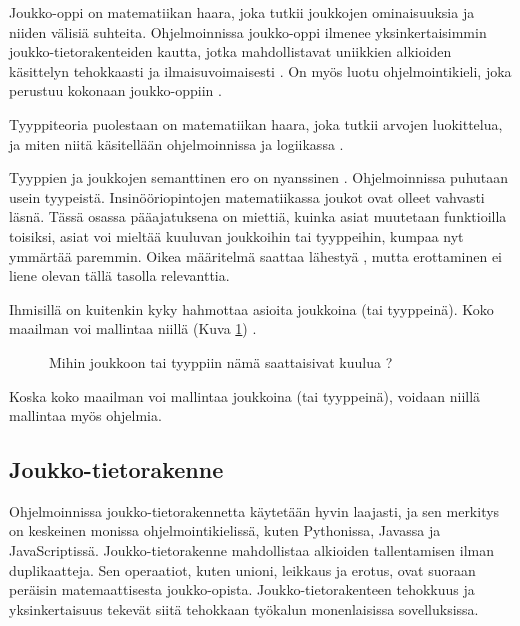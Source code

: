 Joukko-oppi on matematiikan haara, joka tutkii joukkojen ominaisuuksia ja niiden välisiä suhteita. Ohjelmoinnissa joukko-oppi ilmenee yksinkertaisimmin joukko-tietorakenteiden kautta, jotka mahdollistavat uniikkien alkioiden käsittelyn tehokkaasti ja ilmaisuvoimaisesti \cite{mdn_set,mdn_set_methods}. On myös luotu ohjelmointikieli, joka perustuu kokonaan joukko-oppiin \cite{SETL_SET_LANGUAGE}.

Tyyppiteoria puolestaan on matematiikan haara, joka tutkii arvojen luokittelua, ja miten niitä käsitellään ohjelmoinnissa ja logiikassa \cite{type_theory,algebraic_data_types}.

Tyyppien ja joukkojen semanttinen ero on nyanssinen \cite{type_vs_set}. Ohjelmoinnissa puhutaan usein tyypeistä. Insinööriopintojen matematiikassa joukot ovat olleet vahvasti läsnä. Tässä osassa pääajatuksena on miettiä, kuinka asiat muutetaan funktioilla toisiksi, asiat voi mieltää kuuluvan joukkoihin tai tyyppeihin, kumpaa nyt ymmärtää paremmin. Oikea määritelmä saattaa lähestyä , mutta erottaminen ei liene olevan tällä tasolla relevanttia.

Ihmisillä on kuitenkin kyky hahmottaa asioita joukkoina (tai tyyppeinä). Koko maailman voi mallintaa niillä (Kuva \ref{fig:fruit_set}) \cite{algebraic_data_types}.


\begin{figure}[ht]
    \centering
    \caption{Mihin joukkoon tai tyyppiin nämä saattaisivat kuulua \cite{viljofruits}?}
    \label{fig:fruit_set}
\end{figure}

Koska koko maailman voi mallintaa joukkoina (tai tyyppeinä), voidaan niillä mallintaa myös ohjelmia.




\subsection{Joukko-tietorakenne}

Ohjelmoinnissa joukko-tietorakennetta käytetään hyvin laajasti, ja sen merkitys on keskeinen monissa ohjelmointikielissä, kuten Pythonissa, Javassa ja JavaScriptissä. Joukko-tietorakenne mahdollistaa alkioiden tallentamisen ilman duplikaatteja. Sen operaatiot, kuten unioni, leikkaus ja erotus, ovat suoraan peräisin matemaattisesta joukko-opista. Joukko-tietorakenteen tehokkuus ja yksinkertaisuus tekevät siitä tehokkaan työkalun monenlaisissa sovelluksissa. \citep{mdn_set,ecma_spec}

